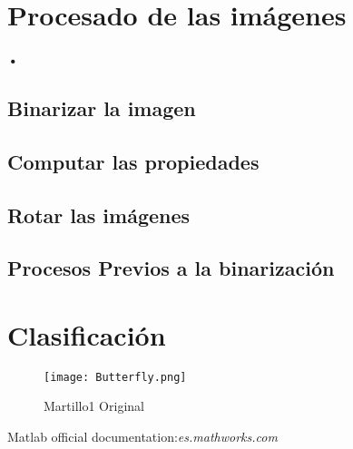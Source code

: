 \documentclass[es,gi]{ifirak}\usepackage[]{graphicx}\usepackage[]{color}
\begin{document}
\section{Procesado de las imágenes}
\paragraph{•}
\subsection{Binarizar la imagen}

\subsection{Computar las propiedades}

\subsection{Rotar las imágenes}

\subsection{Procesos Previos a la binarización}

\section{Clasificación}

\begin{figure}[hbtp]
\centering
\texttt{[image: Butterfly.png]}
\caption{Martillo1 Original}
\end{figure}

\begin{thebibliography}{arauak}
	
	 Matlab official documentation:\textit{es.mathworks.com}
	
\end{thebibliography}
\end{document}
